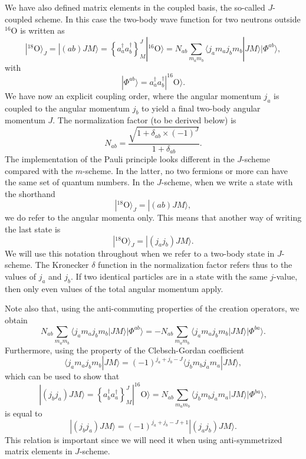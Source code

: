\documentclass[graybox,sectrefs,envcountresetchap,open=right]{svmonodo}
\begin{document}
We have also defined matrix elements in the coupled basis, the so-called $J$-coupled scheme.
In this case the two-body wave function for two neutrons outside ${}^{16}\mbox{O}$ is written as 
\[
|^{18}\mathrm{O}\rangle_J =|(ab)JM\rangle  = \left\{a^{\dagger}_aa^{\dagger}_b\right\}^J_M|^{16}\mathrm{O}\rangle=N_{ab}\sum_{m_am_b}\langle j_am_aj_bm_b|JM\rangle|\Phi^{ab}\rangle, 
\]
with
\[
|\Phi^{ab}\rangle=a^{\dagger}_aa^{\dagger}_b|^{16}\mathrm{O}\rangle.
\]
We have now an explicit coupling order, where the angular momentum $j_a$ is coupled to the angular momentum $j_b$ to yield a final two-body angular momentum $J$. 
The normalization factor (to be derived below) is
\[
N_{ab}=\frac{\sqrt{1+\delta_{ab}\times (-1)^J}}{1+\delta_{ab}}.
\]
The implementation of the Pauli principle looks different in the $J$-scheme compared with the $m$-scheme. In the latter, no two fermions or more can have the same set of quantum numbers. In the $J$-scheme, when we write a state with the shorthand 
\[
|^{18}\mathrm{O}\rangle_J =|(ab)JM\rangle,
\]
we do refer to the angular momenta only. This means that another way of writing the last state is
\[
|^{18}\mathrm{O}\rangle_J =|(j_aj_b)JM\rangle.
\]
We will use this notation throughout when we refer to a two-body state in $J$-scheme. The Kronecker $\delta$ function in the normalization factor 
refers thus to the values of $j_a$ and $j_b$. If two identical particles are in a state with the same $j$-value, then only even values of the total angular momentum apply.

\noindent
Note also that, using the anti-commuting properties of the creation operators, we obtain
\[
N_{ab}\sum_{m_am_b}\langle j_am_aj_bm_b|JM\rangle|\Phi^{ab}\rangle=-N_{ab}\sum_{m_am_b}\langle j_am_aj_bm_b|JM\rangle|\Phi^{ba}\rangle.
\]
Furthermore, using the property of the Clebsch-Gordan coefficient
\[
\langle j_am_aj_bm_b|JM\rangle=(-1)^{j_a+j_b-J}\langle j_bm_bj_am_a|JM\rangle,
\]
which can be used to show that
\[
|(j_bj_a)JM\rangle  = \left\{a^{\dagger}_ba^{\dagger}_a\right\}^J_M|^{16}\mathrm{O}\rangle=N_{ab}\sum_{m_am_b}\langle j_bm_bj_am_a|JM\rangle|\Phi^{ba}\rangle, 
\]
is equal to 
\[
|(j_bj_a)JM\rangle=(-1)^{j_a+j_b-J+1}|(j_aj_b)JM\rangle.
\]
This relation is important since we will need it when using anti-symmetrized matrix elements in $J$-scheme.
\end{document}
